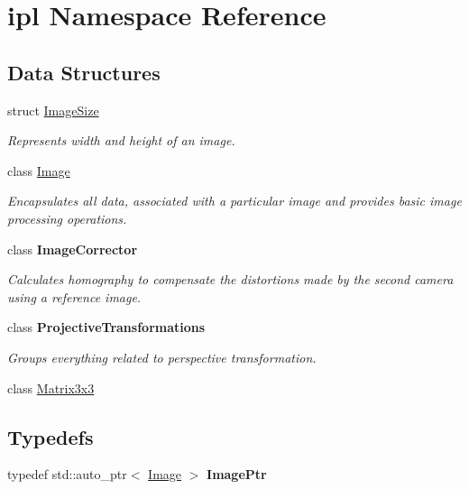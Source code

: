 \hypertarget{namespaceipl}{
\section{ipl Namespace Reference}
\label{namespaceipl}
}
\subsection*{Data Structures}
\begin{DoxyCompactItemize}
\item 
struct \hyperlink{structipl_1_1ImageSize}{ImageSize}
\begin{DoxyCompactList}\small\item\em Represents width and height of an image. \end{DoxyCompactList}\item 
class \hyperlink{classipl_1_1Image}{Image}
\begin{DoxyCompactList}\small\item\em Encapsulates all data, associated with a particular image and provides basic image processing operations. \end{DoxyCompactList}\item 
class {\bfseries ImageCorrector}
\begin{DoxyCompactList}\small\item\em Calculates homography to compensate the distortions made by the second camera using a reference image. \end{DoxyCompactList}\item 
class {\bfseries ProjectiveTransformations}
\begin{DoxyCompactList}\small\item\em Groups everything related to perspective transformation. \end{DoxyCompactList}\item 
class \hyperlink{classipl_1_1Matrix3x3}{Matrix3x3}
\end{DoxyCompactItemize}
\subsection*{Typedefs}
\begin{DoxyCompactItemize}
\item 
\hypertarget{namespaceipl_a487eca73b8111bc641a2097a5c415ecf}{
typedef std::auto\_\-ptr$<$ \hyperlink{classipl_1_1Image}{Image} $>$ {\bfseries ImagePtr}}
\label{namespaceipl_a487eca73b8111bc641a2097a5c415ecf}

\end{DoxyCompactItemize}
